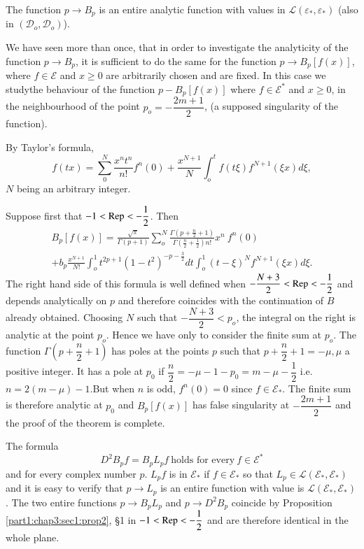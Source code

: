 \begin{theorem*}
  The function $p \to B_p$ is an entire analytic function with values
  in $\mathscr{L}(\varepsilon_*, \varepsilon_*)$ (also in
  $(\mathscr{D}_o, \mathscr{D}_o )$). 
\end{theorem*}

We have seen more than once, that in order to investigate the
analyticity of the function $p \to B_p$, it is sufficient to do the
same for the function $p \to B_p [f (x)]$, where $f \in \mathscr{E}$
and $x \geq 0$ are  arbitrarily chosen and are fixed. In this case we
study\pageoriginale the behaviour of the function $p - B_p [f(x)]$ where $f \in
\mathscr{E}^*$ and $x \geq 0$, in the neighbourhood of the point $p_o
= - \dfrac{2m+1}{2}$, (a supposed singularity of the function). 

By Taylor's formula,
$$
f(tx) = \sum^N_0 \frac{x^n t^n}{n!} f^n(0) +  \frac{x^{N+1}}{N}
\int^t_o f(t \xi) f^{N+1}( \xi x) d \xi, 
$$
$N$ being an arbitrary integer.

Suppose first that $ -1 < \operatorname{Rep} < - \dfrac{1}{2}$. Then 
\begin{multline*}
  B_p [f(x)] = \frac{\sqrt{\pi}}{\Gamma (p+1)} \sum^N_o \frac{\Gamma
    \left(p+ \frac{n}{2} +1\right)}{\Gamma \left(\frac{n}{2}+
    \frac{1}{2}\right)  n !} x^n ~f^n (0) \\
  +b_p \frac{x^{N+1}}{N !} \int^1_o t^{2 p+1} (1-t^2)^{-p -
    \frac{3}{2}} dt \int^1_o (t- \xi)^N  f^{N+1} (\xi x) d \xi.  
\end{multline*}
The right hand side of this formula is well defined when
$-\dfrac{N+3}{2} < \operatorname{Rep} < - \dfrac{1}{2}$ and depends analytically on
$p$ and therefore coincides with the continuation of $B$ already
obtained. Choosing $N$ such that $- \dfrac{N+3}{2}< p_o$, the integral
on the right is analytic at the point $p_o$. Hence we have only to
consider the finite sum at $p_o$. The function $\Gamma (p +
\dfrac{n}{2} +1)$ has poles at the points $p$ such that $p+
\dfrac{n}{2} +1 = - \mu, \mu$ a positive integer. It has a pole at
$p_0$ if $\dfrac{n}{2} =-  \mu -1 - p_0 = m - \mu -
\dfrac{1}{2}$ i.e. $n = 2 (m -\mu) -1$.\pageoriginale But when $n$ is odd, $f^n(0) =
0$ since $f \in \mathscr{E}_*$. The finite sum is therefore analytic
at $p_0$ and  $B_p [f (x)]$ has false singularity at $-
\dfrac{2m+1}{2}$ and the proof of the theorem is complete. 

\begin{theorem*}
  The formula 
  $$
  D^2 B_p f = B_p L_p f ~\text{holds for every}~ f \in
  \mathscr{E}^*
  $$ 
  and for every complex number $p$. $L_p f$ is in
  $\mathscr{E}_*$ if $ f \in \mathscr{E}_*$ so that $L_p \in
  \mathscr{L}( \mathscr{E}_*, \mathscr{E}_*)$ and it is easy to verify
  that $p \to L_p$ is an entire function with value is $\mathscr{L}(
  \mathscr{E}_*, \mathscr{E}_*)$. The two entire functions $p \to B_p
  L_p$ and $p \to D^2 B_p$ coincide by
  Proposition \ref{part1:chap3:sec1:prop2}, \S 1 in $-1 <
  \operatorname{Rep} <  - \dfrac{1}{2}$ and are therefore identical in the whole
  plane. 
\end{theorem*}

